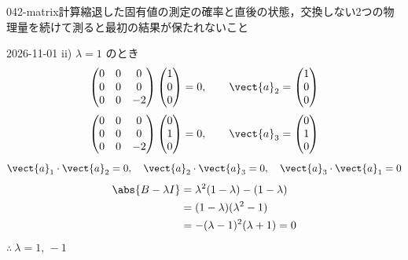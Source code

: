 \documentclass[uplatex,dvipdfmx,a4paper,11pt]{jsarticle}
\begin{document}
\begin{mondai}{042-matrix}{計算}{縮退した固有値の測定の確率と直後の状態，交換しない2つの物理量を続けて測ると最初の結果が保たれないこと}
\begin{kotaeutsushi}{2026-11-01}
ii) $\lambda=1$ のとき
\[ \begin{pmatrix}0&0&0\\0&0&0\\0&0&-2\end{pmatrix}\begin{pmatrix}1\\0\\0\end{pmatrix}=0,\qquad\vect{a}_{2}=\begin{pmatrix}1\\0\\0\end{pmatrix} \]
\[ \begin{pmatrix}0&0&0\\0&0&0\\0&0&-2\end{pmatrix}\begin{pmatrix}0\\1\\0\end{pmatrix}=0,\qquad\vect{a}_{3}=\begin{pmatrix}0\\1\\0\end{pmatrix} \]
\[ \vect{a}_{1}\cdot\vect{a}_{2}=0,\quad\vect{a}_{2}\cdot\vect{a}_{3}=0,\quad\vect{a}_{3}\cdot\vect{a}_{1}=0 \]
\begin{align*}
\abs{B-\lambda I}&=\lambda^{2}(1-\lambda)-(1-\lambda)\\
&=(1-\lambda)(\lambda^{2}-1)\\
&=-(\lambda-1)^{2}(\lambda+1)=0
\end{align*}
$\therefore\ \lambda=1,\,-1$


\end{kotaeutsushi}
\end{mondai}
\end{document}
